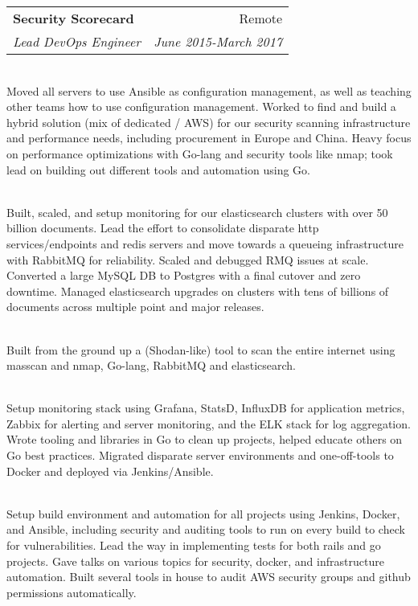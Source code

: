 \documentclass[a4paper,11pt,sans]{article}
\makeatletter
\newcommand{\ressubheading}[4]{
\begin{tabular*}{7.0in}{l@{\extracolsep{\fill}}r}
		\textbf{#1} & #2 \\
		\textit{#3} & \textit{#4} \\
\end{tabular*}\vspace{-6pt}}
\makeatother
\begin{document}
\ressubheading{Security Scorecard}{Remote}{Lead DevOps Engineer}{June 2015-March 2017}

\hspace{5pt} \\

Moved all servers to use Ansible as configuration management, as well
as teaching other teams how to use configuration management. Worked
to find and build a hybrid solution (mix of dedicated / AWS) for our
security scanning infrastructure and performance needs, including procurement in Europe and China. Heavy focus on performance
optimizations with Go-lang and security tools like nmap; took lead on
building out different tools and automation using Go. 

\hspace{5pt} \\

Built,
scaled, and setup monitoring for our elasticsearch clusters with over 50
billion documents. Lead the effort to consolidate disparate http
services/endpoints and redis servers and move towards a queueing infrastructure with
RabbitMQ for reliability. Scaled and debugged RMQ issues at scale. Converted a large MySQL DB to Postgres with a final cutover and zero downtime. Managed elasticsearch upgrades on clusters with tens of billions of documents across multiple point and major releases.

\hspace{5pt} \\


Built from the
ground up a (Shodan-like) tool to scan the entire internet using
masscan and nmap, Go-lang, RabbitMQ and elasticsearch.

\hspace{5pt} \\

Setup monitoring stack using Grafana, StatsD,
InfluxDB for application metrics, Zabbix for alerting and server
monitoring, and the ELK stack for log aggregation. Wrote tooling and
libraries in Go to clean up projects, helped educate others on Go best
practices. Migrated disparate server environments and one-off-tools to
Docker and deployed via Jenkins/Ansible. 

\haspace{5pt} \\

Setup build environment and
automation for all projects using Jenkins, Docker, and Ansible,
including security and auditing tools to run on every build to check
for vulnerabilities. Lead the way in implementing tests for both rails
and go projects. Gave talks on various topics for security,
docker, and infrastructure automation. Built several tools in house to
audit AWS security groups and github permissions automatically.
\end{document}

